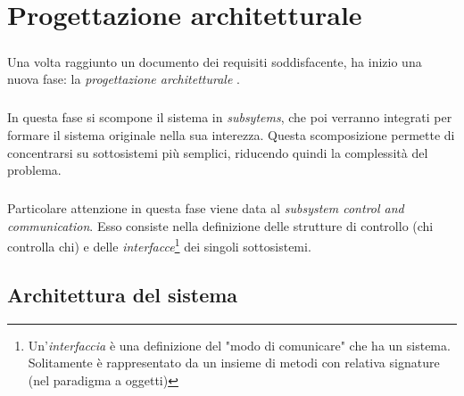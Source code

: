 \documentclass[12pt,a4paper,twoside,english,italian]{book}
\begin{document}
\chapter{Progettazione architetturale}

\paragraph{} Una volta raggiunto un documento dei requisiti soddisfacente, ha inizio una nuova fase: la \emph{progettazione architetturale} \cite{prog_architetturale}. 

\paragraph{} In questa fase si scompone il sistema in \emph{subsytems}, che poi verranno integrati per formare il sistema originale nella sua interezza. Questa scomposizione permette di concentrarsi su sottosistemi più semplici, riducendo quindi la complessità del problema. 

\paragraph{} Particolare attenzione in questa fase viene data al \emph{subsystem control and communication}. Esso consiste nella definizione delle strutture di controllo (chi controlla chi) e delle \emph{interfacce}\footnote{Un'\emph{interfaccia} è una definizione del "modo di comunicare" che ha un sistema. Solitamente è rappresentato da un insieme di metodi con relativa signature (nel paradigma a oggetti)} dei singoli sottosistemi.

\section{Architettura del sistema}
\end{document}
